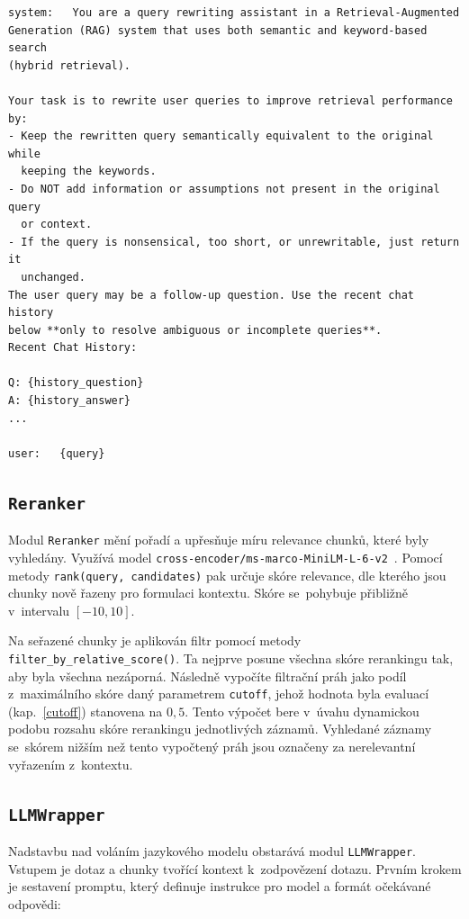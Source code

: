 \begin{verbatim}
system:   You are a query rewriting assistant in a Retrieval-Augmented 
Generation (RAG) system that uses both semantic and keyword-based search
(hybrid retrieval).

Your task is to rewrite user queries to improve retrieval performance by:
- Keep the rewritten query semantically equivalent to the original while 
  keeping the keywords.
- Do NOT add information or assumptions not present in the original query
  or context.
- If the query is nonsensical, too short, or unrewritable, just return it
  unchanged.
The user query may be a follow-up question. Use the recent chat history
below **only to resolve ambiguous or incomplete queries**. 
Recent Chat History:

Q: {history_question}
A: {history_answer}
...

user:   {query}
\end{verbatim}

\subsection{\texttt{Reranker}}
\label{reranker}
Modul \texttt{Reranker} mění pořadí a upřesňuje míru relevance chunků, které byly vyhledány. Využívá model \texttt{cross-encoder/ms-marco-MiniLM-L-6-v2}~\cite{crossencoder}. Pomocí metody \texttt{rank(query, candidates)} pak určuje skóre relevance, dle kterého jsou chunky nově řazeny pro formulaci kontextu. Skóre se~pohybuje přibližně v~intervalu $[-10, 10]$.

Na seřazené chunky je aplikován filtr pomocí metody \texttt{filter\_by\_relative\_score()}. Ta nejprve posune všechna skóre rerankingu tak, aby byla všechna nezáporná. Následně vypočíte filtrační práh jako podíl z~maximálního skóre daný parametrem \texttt{cutoff}, jehož hodnota byla evaluací (kap.~\ref{cutoff}) stanovena na $0{,}5$. Tento výpočet bere v~úvahu dynamickou podobu rozsahu skóre rerankingu jednotlivých záznamů. Vyhledané záznamy se~skórem nižším než tento vypočtený práh jsou označeny za nerelevantní vyřazením z~kontextu.

\subsection{\texttt{LLMWrapper}}
\label{llmwrapper}
Nadstavbu nad voláním jazykového modelu obstarává modul \texttt{LLMWrapper}. Vstupem je dotaz a chunky tvořící kontext k~zodpovězení dotazu. Prvním krokem je sestavení promptu, který definuje instrukce pro model a formát očekávané odpovědi:

